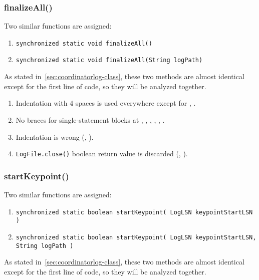 \subsubsection{finalizeAll()}
Two similar functions are assigned:
\begin{enumerate}
    \item \texttt{\footnotesize synchronized static void finalizeAll()}
    \item \texttt{\footnotesize synchronized static void finalizeAll(String logPath)}
\end{enumerate}

As stated in~\autoref{sec:coordinatorlog-class}, these two methods are almost identical except for the first line of code, so they will be analyzed together.

\begin{enumerate}
    \item {} Indentation with 4 spaces is used everywhere except for , .
    \item {} No braces for single-statement blocks at , , , , , .
    \item {} Indentation is wrong (, ).
    \item {} \texttt{LogFile.close()} boolean return value is discarded (, ).
\end{enumerate}

\subsubsection{startKeypoint()}
Two similar functions are assigned:
\begin{enumerate}
    \item \texttt{\footnotesize synchronized static boolean startKeypoint( LogLSN keypointStartLSN )}
    \item \texttt{\footnotesize synchronized static boolean startKeypoint( LogLSN keypointStartLSN, String logPath )}
\end{enumerate}

As stated in~\autoref{sec:coordinatorlog-class}, these two methods are almost identical except for the first line of code, so they will be analyzed together.


